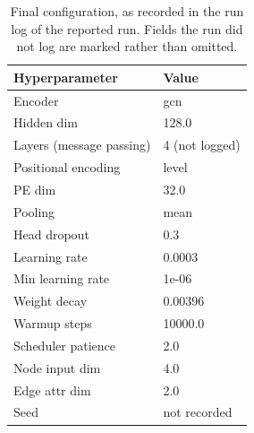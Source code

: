 \begin{table}[htbp]
\centering
\caption{Final configuration, as recorded in the run log of the reported run. Fields the run did not log are marked rather than omitted.}
\label{tab:rq1_hyperparameters}
\small
\begin{tabular}{ll}
\toprule
\textbf{Hyperparameter} & \textbf{Value} \\
\midrule
Encoder & gcn \\
Hidden dim & 128.0 \\
Layers (message passing) & 4 (not logged) \\
Positional encoding & level \\
PE dim & 32.0 \\
Pooling & mean \\
Head dropout & 0.3 \\
Learning rate & 0.0003 \\
Min learning rate & 1e-06 \\
Weight decay & 0.00396 \\
Warmup steps & 10000.0 \\
Scheduler patience & 2.0 \\
Node input dim & 4.0 \\
Edge attr dim & 2.0 \\
Seed & not recorded \\
\bottomrule
\end{tabular}
\end{table}
